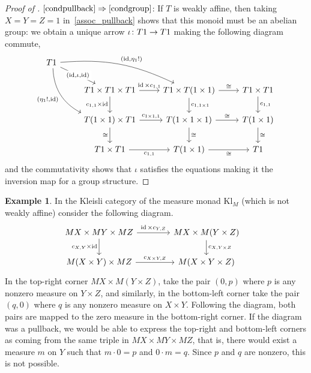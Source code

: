 \documentclass[a4paper,UKenglish,numberwithinsect,cleveref, autoref, thm-restate]{lipics-v2021}
\theoremstyle{plain} %
\theoremstyle{definition} %
\newtheorem{myexample}[mytheorem]{Example}
\begin{document}
\begin{proof}[Proof of ]
 $\ref{condpullback}\Rightarrow\ref{condgroup}$:
 If $T$ is weakly affine, then taking $X = Y = Z = 1$ in~\eqref{assoc_pullback} shows that this monoid must be an abelian group: we obtain a unique arrow $\iota \colon T1 \to T1$ making the following diagram commute,
	\[
		\begin{tikzcd}
			T1 \ar{dr}[description]{(\id,\iota,\id)} \ar[bend left=15]{drr}{(\id,\eta_1 !)} \ar[bend right,swap]{ddr}{(\eta_1 !,\id)} \\
			&	T1 \times T1 \times T1 \ar{r}{\id \times c_{1,1}} \ar[swap]{d}{c_{1,1} \times \id}	& T1 \times T(1\times 1) \ar{d}{c_{1,1\times 1}} \ar{r}{\cong} & T1\times T1 \ar{d}{c_{1,1}}	\\
			&	T(1\times 1) \times T1 \ar{r}{c_{1\times 1,1}} \ar{d}[swap]{\cong}	& T(1\times 1\times 1) \ar{d}{\cong} \ar{r}{\cong} & T(1\times 1) \ar{d}{\cong} \\
			& T1\times T1 \ar{r}[swap]{c_{1,1}} & T(1\times 1) \ar{r}[swap]{\cong} & T1
		\end{tikzcd}
	\]
	and the commutativity shows that $\iota$ satisfies the equations making it the inversion map for a group structure.
\end{proof}


\begin{myexample}
 In the Kleisli category of the measure monad $\mathrm{Kl}_M$ (which is not weakly affine) consider the following diagram.
 \[
		\hspace{-9pt}	%
		\begin{tikzcd}[column sep=3.3pc]
			MX \times MY \times MZ \ar{r}{\id \times c_{Y,Z}} \ar[swap]{d}{c_{X,Y} \times \id}	& MX \times M(Y \times Z) \ar{d}{c_{X,Y \times Z}}	\\
			M(X \times Y) \times MZ \ar{r}{c_{X\times Y,Z}}						& M(X \times Y \times Z)
		\end{tikzcd}
	\]
	In the top-right corner $MX\times M(Y\times Z)$, take the pair $(0,p)$ where $p$ is any nonzero measure on $Y\times Z$, and similarly, in the bottom-left corner take the pair $(q,0)$ where $q$ is any nonzero measure on $X\times Y$. Following the diagram, both pairs are mapped to the zero measure in the bottom-right corner. If the diagram was a pullback, we would be able to express the top-right and bottom-left corners as coming from the same triple in $MX\times MY\times MZ$, that is, there would exist a measure $m$ on $Y$ such that $m\cdot 0=p$ and $0\cdot m=q$. Since $p$ and $q$ are nonzero, this is not possible.
\end{myexample}
\end{document}
